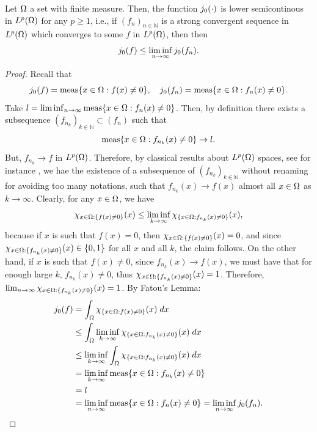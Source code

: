 \begin{proposition}
	Let $\Omega$ a set with finite measure. Then, the function 
	$j_0(\cdot)$ is lower semicontinous in $L^p(\Omega)$ for any $p\ge 1$,
	i.e., if $(f_n)_{n\in\mathbb{N}}$ is a strong convergent 
	sequence in $L^p(\Omega)$ which converges to some $f$ in $L^p(\Omega)$, then
	then
	\[
	j_0(f)\le \liminf_{n\to\infty} j_0(f_n).
	\]
\end{proposition}
\begin{proof}
	Recall that
	\[
	j_0(f)=\text{meas}\{x\in \Omega: f(x)\neq 0\}, \quad j_0(f_n)=\text{meas}\{x\in \Omega: f_n(x)\neq 0\}.
	\]
	Take $l=\liminf_{n\to\infty}\text{meas}\{x\in \Omega: f_n(x)\neq 0\}$. Then, by definition there exists
	a subsequence $(f_{n_k})_{k\in\mathbb{N}}\subset (f_{n})$ such that
	\[
	\text{meas}\{x\in \Omega: f_{n_k}(x)\neq 0\}\to l.
	\]
	But, $f_{n_k}\to f$ in $L^p(\Omega)$. Therefore, by classical results about 
	$L^p(\Omega)$ spaces, see for instance \cite[Theorem 2.3]{ambrosetti}, we
	hae the existence of a subsequence of $(f_{n_k})_{k\in\mathbb{N}}$ without renaming for avoiding 
	too many notations, such that $f_{n_{k}}(x)\to f(x)$ almost all $x\in \Omega$ as $k\to\infty$.
	Clearly, for any $x\in \Omega$, we have 
	\[
	\chi_{x\in \Omega:\{f(x)\neq 0\}}(x)\le \liminf_{k\to\infty} \chi_{\{x\in \Omega:f_{n_k}(x)\neq 0\}}(x), 
	\]
	because if $x$ is such that $f(x)=0$, then  $\chi_{x\in \Omega:\{f(x)\neq 0\}}(x)=0$, and
	since $\chi_{x\in \Omega: \{f_{n_k}(x)\neq 0\}}(x)\in \{0,1\}$ for all $x$ and all $k$, the claim follows. On the
	other hand, if	$x$ is such that $f(x)\ne 0$, since $f_{n_k}(x)\to f(x)$, we must have that 
	for enough large $k$, $f_{n_k}(x)\ne 0$, thus $\chi_{x\in \Omega:\{f_{n_k}(x)\neq 0\}}(x)=1$. Therefore, 
	$\lim_{n\to \infty}\chi_{x\in \Omega:\{f_{n_k}(x)\neq 0\}}(x)=1$. By Fatou's Lemma:
	\begin{align*}
	j_0(f)&=\int_{\Omega}\chi_{\{x\in \Omega:f(x)\neq 0\}}(x)\; dx \\
	&\le \int_{\Omega}\liminf_{k\to\infty} \chi_{\{x\in \Omega:f_{n_k}(x)\neq 0\}}(x)\; dx\\
	&\le \liminf_{k\to\infty} \int_{\Omega} \chi_{\{x\in \Omega:f_{n_k}(x)\neq 0\}}(x)\; dx\\
	&=\liminf_{k\to \infty} \text{meas}\{x\in \Omega: f_{n_k}(x)\neq 0\}\\
	&=l\\
	&=\liminf_{n\to\infty}\text{meas}\{x\in \Omega: f_n(x)\neq 0\}=\liminf_{n\to\infty}j_0(f_n).
	\end{align*}
\end{proof}

